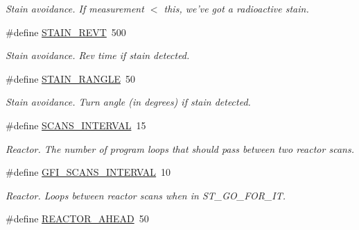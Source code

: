 \begin{DoxyCompactItemize}
\begin{DoxyCompactList}\small\item\em Stain avoidance. If measurement $<$ this, we've got a radioactive stain. \item\end{DoxyCompactList}\item 
\hypertarget{reactor_8nxc_a23085c5995bfb533de15f749911735ee}{
\#define \hyperlink{reactor_8nxc_a23085c5995bfb533de15f749911735ee}{STAIN\_\-REVT}~500}
\label{reactor_8nxc_a23085c5995bfb533de15f749911735ee}

\begin{DoxyCompactList}\small\item\em Stain avoidance. Rev time if stain detected. \item\end{DoxyCompactList}\item 
\hypertarget{reactor_8nxc_aa065f0a3dcd588addce086ed8e16ef21}{
\#define \hyperlink{reactor_8nxc_aa065f0a3dcd588addce086ed8e16ef21}{STAIN\_\-RANGLE}~50}
\label{reactor_8nxc_aa065f0a3dcd588addce086ed8e16ef21}

\begin{DoxyCompactList}\small\item\em Stain avoidance. Turn angle (in degrees) if stain detected. \item\end{DoxyCompactList}\item 
\hypertarget{reactor_8nxc_a0ffed1b076ac2fe20116fa0f0ae633f1}{
\#define \hyperlink{reactor_8nxc_a0ffed1b076ac2fe20116fa0f0ae633f1}{SCANS\_\-INTERVAL}~15}
\label{reactor_8nxc_a0ffed1b076ac2fe20116fa0f0ae633f1}

\begin{DoxyCompactList}\small\item\em Reactor. The number of program loops that should pass between two reactor scans. \item\end{DoxyCompactList}\item 
\hypertarget{reactor_8nxc_a3c84fa327c80928102bf5fcd704df9e6}{
\#define \hyperlink{reactor_8nxc_a3c84fa327c80928102bf5fcd704df9e6}{GFI\_\-SCANS\_\-INTERVAL}~10}
\label{reactor_8nxc_a3c84fa327c80928102bf5fcd704df9e6}

\begin{DoxyCompactList}\small\item\em Reactor. Loops between reactor scans when in ST\_\-GO\_\-FOR\_\-IT. \item\end{DoxyCompactList}\item 
\hypertarget{reactor_8nxc_ad57e5a239da13ddea4ab2548b177dcf3}{
\#define \hyperlink{reactor_8nxc_ad57e5a239da13ddea4ab2548b177dcf3}{REACTOR\_\-AHEAD}~50}
\label{reactor_8nxc_ad57e5a239da13ddea4ab2548b177dcf3}


\end{DoxyCompactItemize}
